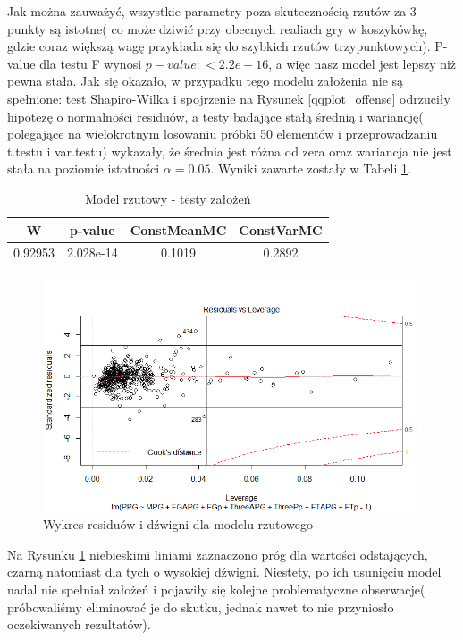 \documentclass[11pt,a4paper]{article}
\begin{document}
Jak można zauważyć, wszystkie parametry poza skutecznością rzutów za 3 punkty są istotne( co może dziwić przy obecnych realiach gry w koszykówkę, gdzie coraz większą wagę przykłada się do szybkich rzutów trzypunktowych). P-value dla testu F wynosi $p-value: < 2.2e-16$, a więc nasz model jest lepszy niż pewna stała. Jak się okazało, w przypadku tego modelu założenia nie są spełnione: test Shapiro-Wilka i spojrzenie na Rysunek \ref{qqplot_offense} odrzuciły hipotezę o normalności residuów, a testy badające stałą średnią i wariancję( polegające na wielokrotnym losowaniu próbki 50 elementów i przeprowadzaniu t.testu i var.testu) wykazały, że średnia jest różna od zera oraz wariancja nie jest stała na poziomie istotności $\alpha=0.05$. Wyniki zawarte zostały w Tabeli \ref{zalozenia_offense}.
\begin{table}[H]
	\begin{tabular}{| c | c | c | c |}
		\hline
		W & p-value & ConstMeanMC & ConstVarMC\\ \hline
		0.92953 & 2.028e-14 & 0.1019 & 0.2892 \\ \hline
	\end{tabular}
	\caption{Model rzutowy - testy założeń}
	\label{zalozenia_offense}
\end{table}
\begin{figure}[t]
	\includegraphics[width=\textwidth]{offense_4}
	\caption{Wykres residuów i dźwigni dla modelu rzutowego}
	\label{leverage_offense}
	\centering
\end{figure}
Na Rysunku \ref{leverage_offense} niebieskimi liniami zaznaczono próg dla wartości odstających, czarną natomiast dla tych o wysokiej dźwigni. Niestety, po ich usunięciu model nadal nie spełniał założeń i pojawiły się kolejne problematyczne obserwacje( próbowaliśmy eliminować je do skutku, jednak nawet to nie przyniosło oczekiwanych rezultatów).
\end{document}
